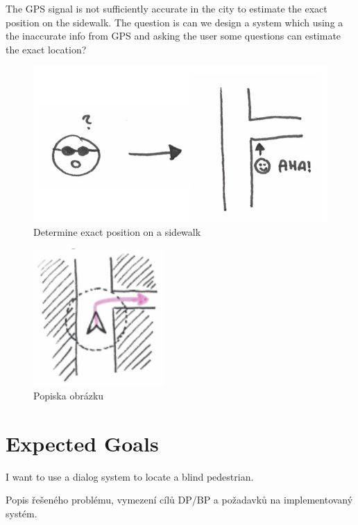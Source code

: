 \documentclass[11pt,oneside,a4paper]{book}
\begin{document}
	The GPS signal is not sufficiently accurate in the city to estimate the exact position on the sidewalk. The question is can we design a system which using a the inaccurate info from GPS and asking the user some questions can estimate the exact location?
	 
\begin{figure}[h]
	\centering
	\includegraphics[width=0.7\linewidth]{figures/introduction/determine-exact-position-on-sidewalk}
	\caption[Determine exact position on a sidewalk]{Determine exact position on a sidewalk}
	\label{fig:determine-exact-position-on-sidewalk}
\end{figure}
	
	
	
\begin{figure}[h]
	\centering
	\includegraphics[width=5cm]{figures/introduction/gps-shows}
	\caption[Current Navigations]{Popiska obrázku}
	\label{fig:gps-shows}
\end{figure}

	
	

	
	
	
	
	\section{Expected Goals}
	
	I want to use a dialog system to locate a blind pedestrian.
	
	Popis řešeného problému, vymezení cílů DP/BP a požadavků na implementovaný systém.
	
\end{document}
